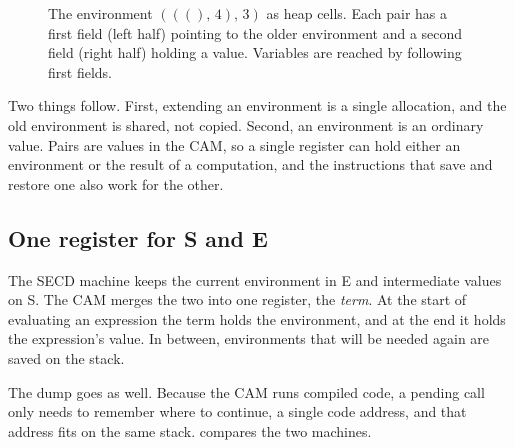 \documentclass[11pt,a4paper]{article}
\newcommand{\pr}[2]{(#1,\, #2)}
\newcommand{\unit}{()}
\newcommand{\seq}{\mathbin{;}}
\theoremstyle{definition}
\theoremstyle{plain}
\begin{document}
\begin{figure}[t]
\centering
{}
\caption{The environment $\pr{\pr{\unit}{4}}{3}$ as heap cells. Each pair
has a first field (left half) pointing to the older environment and a
second field (right half) holding a value. Variables are reached by following first fields.}
\label{fig:pairs}
\end{figure}

Two things follow. First, extending an environment is a single allocation, and
the old environment is shared, not copied. Second, an environment is an
ordinary value. Pairs are values in the CAM, so a single register can hold
either an environment or the result of a computation, and the instructions
that save and restore one also work for the other.

\subsection{One register for S and E}

The SECD machine keeps the current environment in E and intermediate values
on S. The CAM merges the two into one register, the \emph{term}. At the start
of evaluating an expression the term holds the environment, and at the end it
holds the expression's value. In between, environments that will be needed
again are saved on the stack.

The dump goes as well. Because the CAM runs compiled code, a pending call only
needs to remember where to continue, a single code address, and that address
fits on the same stack.  compares the two machines.
\end{document}
